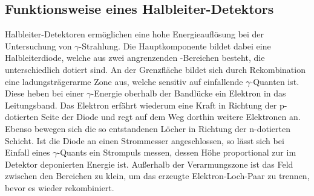 \subsection{Funktionsweise eines Halbleiter-Detektors}
\label{sec:HLDetektor}

Halbleiter-Detektoren ermöglichen eine hohe Energieauflösung bei der Untersuchung von $\gamma$-Strahlung.
Die Hauptkomponente bildet dabei eine Halbleiterdiode, welche aus zwei angrenzenden -Bereichen
besteht, die unterschiedlich dotiert sind.
An der Grenzfläche bildet sich durch Rekombination eine ladungsträgerarme Zone aus, welche sensitiv auf
einfallende $\gamma$-Quanten ist. Diese heben bei einer $\gamma$-Energie oberhalb der Bandlücke ein
Elektron in das Leitungsband. Das Elektron erfährt wiederum eine Kraft in Richtung der p-dotierten
Seite der Diode und regt auf dem Weg dorthin weitere Elektronen an.
Ebenso bewegen sich die so entstandenen Löcher in Richtung der n-dotierten Schicht. Ist die
Diode an einen Strommesser angeschlossen, so lässt sich bei Einfall eines $\gamma$-Quants ein
Strompuls messen, dessen Höhe proportional zur im Detektor deponierten Energie ist.
Außerhalb der Verarmungszone ist das Feld zwischen den Bereichen zu klein, um das erzeugte Elektron-Loch-Paar
zu trennen, bevor es wieder rekombiniert.

